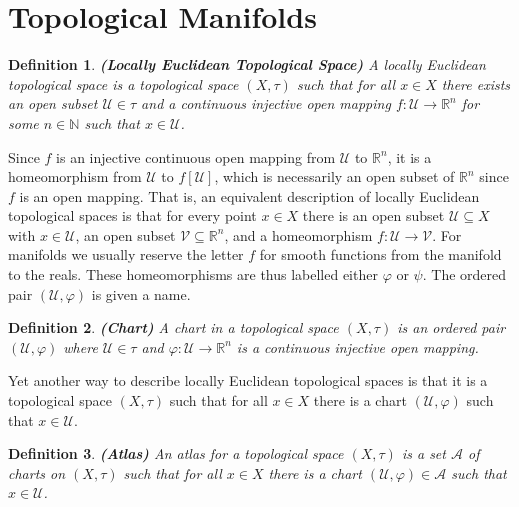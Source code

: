 \documentclass{article}
\theoremstyle{plain}
\theoremstyle{normal}
\newtheorem{definition}{Definition}[section]
\begin{document}
    \section{Topological Manifolds}
        \begin{definition}{\textbf{(Locally Euclidean Topological Space)}}
            A locally Euclidean topological space is a topological space
            $(X,\tau)$ such that for all $x\in{X}$ there exists an open
            subset $\mathcal{U}\in\tau$ and a continuous injective open
            mapping $f:\mathcal{U}\rightarrow\mathbb{R}^{n}$ for some
            $n\in\mathbb{N}$ such that $x\in\mathcal{U}$.
        \end{definition}
        Since $f$ is an injective continuous open mapping from $\mathcal{U}$ to
        $\mathbb{R}^{n}$, it is a homeomorphism from $\mathcal{U}$ to
        $f[\mathcal{U}]$, which is necessarily an open subset of
        $\mathbb{R}^{n}$ since $f$ is an open mapping. That is, an equivalent
        description of locally Euclidean topological spaces is that for every
        point $x\in{X}$ there is an open subset $\mathcal{U}\subseteq{X}$ with
        $x\in\mathcal{U}$, an open subset $\mathcal{V}\subseteq\mathbb{R}^{n}$,
        and a homeomorphism $f:\mathcal{U}\rightarrow\mathcal{V}$. For manifolds
        we usually reserve the letter $f$ for smooth functions from the manifold
        to the reals. These homeomorphisms are thus labelled either $\varphi$ or
        $\psi$. The ordered pair $(\mathcal{U},\varphi)$ is given a name.
        \begin{definition}{\textbf{(Chart)}}
            A chart in a topological space $(X,\tau)$ is an ordered pair
            $(\mathcal{U},\varphi)$ where $\mathcal{U}\in\tau$ and
            $\varphi:\mathcal{U}\rightarrow\mathbb{R}^{n}$ is a continuous
            injective open mapping.
        \end{definition}
        Yet another way to describe locally Euclidean topological spaces is that
        it is a topological space $(X,\tau)$ such that for all $x\in{X}$ there
        is a chart $(\mathcal{U},\varphi)$ such that $x\in\mathcal{U}$.
        \begin{definition}{\textbf{(Atlas)}}
            An atlas for a topological space $(X,\tau)$ is a set
            $\mathcal{A}$ of charts on $(X,\tau)$ such that for all
            $x\in{X}$ there is a chart $(\mathcal{U},\varphi)\in\mathcal{A}$
            such that $x\in\mathcal{U}$.
        \end{definition}
\end{document}
